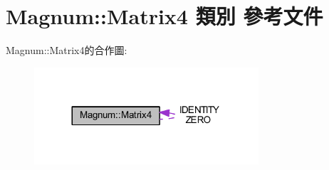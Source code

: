 \hypertarget{class_magnum_1_1_matrix4}{}\section{Magnum\+:\+:Matrix4 類別 參考文件}
\label{class_magnum_1_1_matrix4}


Magnum\+:\+:Matrix4的合作圖\+:\nopagebreak
\begin{figure}[H]
\begin{center}
\leavevmode
\includegraphics[width=236pt]{class_magnum_1_1_matrix4__coll__graph}
\end{center}
\end{figure}
